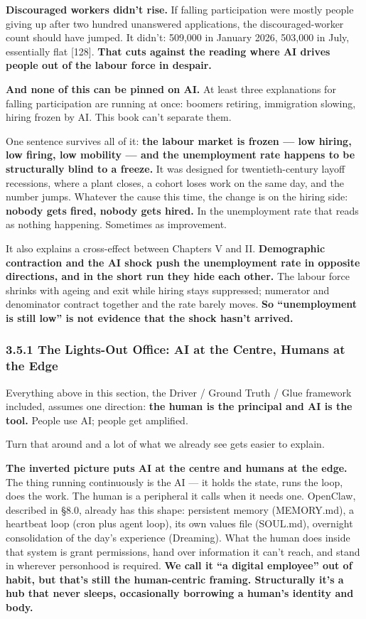 \documentclass[11pt,a4paper]{article}
\begin{document}
\textbf{Discouraged workers didn't rise.} If falling participation were mostly people giving up after two hundred unanswered applications, the discouraged-worker count should have jumped. It didn't: 509,000 in January 2026, 503,000 in July, essentially flat [128]. \textbf{That cuts against the reading where AI drives people out of the labour force in despair.}

\textbf{And none of this can be pinned on AI.} At least three explanations for falling participation are running at once: boomers retiring, immigration slowing, hiring frozen by AI. This book can't separate them.

One sentence survives all of it: \textbf{the labour market is frozen --- low hiring, low firing, low mobility --- and the unemployment rate happens to be structurally blind to a freeze.} It was designed for twentieth-century layoff recessions, where a plant closes, a cohort loses work on the same day, and the number jumps. Whatever the cause this time, the change is on the hiring side: \textbf{nobody gets fired, nobody gets hired.} In the unemployment rate that reads as nothing happening. Sometimes as improvement.

It also explains a cross-effect between Chapters V and II. \textbf{Demographic contraction and the AI shock push the unemployment rate in opposite directions, and in the short run they hide each other.} The labour force shrinks with ageing and exit while hiring stays suppressed; numerator and denominator contract together and the rate barely moves. \textbf{So ``unemployment is still low'' is not evidence that the shock hasn't arrived.}

\subsubsection{3.5.1 The Lights-Out Office: AI at the Centre, Humans at the Edge}

Everything above in this section, the Driver / Ground Truth / Glue framework included, assumes one direction: \textbf{the human is the principal and AI is the tool.} People use AI; people get amplified.

Turn that around and a lot of what we already see gets easier to explain.

\textbf{The inverted picture puts AI at the centre and humans at the edge.} The thing running continuously is the AI --- it holds the state, runs the loop, does the work. The human is a peripheral it calls when it needs one. OpenClaw, described in \S{}8.0, already has this shape: persistent memory (MEMORY.md), a heartbeat loop (cron plus agent loop), its own values file (SOUL.md), overnight consolidation of the day's experience (Dreaming). What the human does inside that system is grant permissions, hand over information it can't reach, and stand in wherever personhood is required. \textbf{We call it ``a digital employee'' out of habit, but that's still the human-centric framing. Structurally it's a hub that never sleeps, occasionally borrowing a human's identity and body.}
\end{document}
